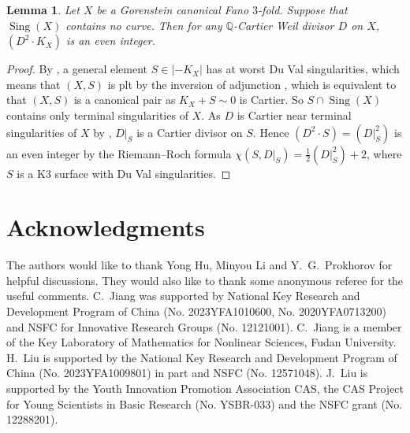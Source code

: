 \documentclass[12pt,twoside]{amsart}
\DeclareMathOperator{\Sing}{Sing}
\newtheorem{lem}[thm]{Lemma}
\theoremstyle{definition}
\begin{document}


   




\begin{lem}\label{lem A2K even}
   Let $X$ be a Gorenstein canonical Fano $3$-fold.
   Suppose that $\Sing(X)$ contains no curve. Then for any $\mathbb{Q}$-Cartier Weil divisor $D$ on $X$, $(D^2\cdot K_X)$ is an even integer.  
\end{lem}
\begin{proof}
    By \cite{Reid1983}, a general element $S\in |-K_X|$ has at worst Du Val singularities, which means that $(X, S)$ is plt by the inversion of adjunction \cite[Theorem~5.50]{KollarMori1998}, which is equivalent to that $(X, S)$ is a canonical pair as $K_X+S\sim 0$ is Cartier. So $S\cap \Sing(X)$ contains only terminal singularities of $X$. As $D$ is Cartier near terminal singularities of $X$ by \cite[Lemma~5.1]{Kawamata1988}, $D|_S$ is a Cartier divisor on $S$. Hence $(D^2\cdot S)=(D|_S^2)$ is an even integer by the Riemann--Roch formula $\chi(S, D|_S)= \frac{1}{2}(D|_S^2)+2$, where $S$ is a K3 surface with Du Val singularities. 
\end{proof}


\section*{Acknowledgments} 
The authors would like to thank Yong Hu, Minyou Li and Y.~G.~Prokhorov for helpful discussions. They would also like to thank some anonymous referee for the useful comments. C.~Jiang was supported by National Key Research and Development Program of China (No. 2023YFA1010600, No. 2020YFA0713200) and NSFC for Innovative Research Groups (No. 12121001). C.~Jiang is a member of the Key Laboratory of Mathematics for Nonlinear Sciences, Fudan University. H.~Liu is supported by the National Key Research and Development Program of China (No. 2023YFA1009801) in part and NSFC (No. 12571048). J.~Liu is supported by the Youth Innovation Promotion Association CAS, the CAS Project for Young Scientists in Basic Research (No. YSBR-033) and the NSFC grant (No. 12288201).


\end{document}
